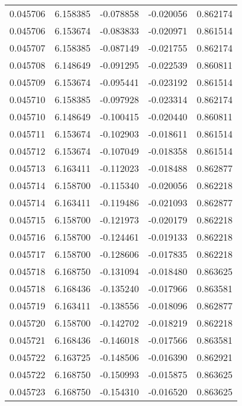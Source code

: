 \begin{tabular}{lrrrr}
0.045706    &  6.158385 & -0.078858 & -0.020056 &             0.862174 \\
0.045706    &  6.153674 & -0.083833 & -0.020971 &             0.861514 \\
0.045707    &  6.158385 & -0.087149 & -0.021755 &             0.862174 \\
0.045708    &  6.148649 & -0.091295 & -0.022539 &             0.860811 \\
0.045709    &  6.153674 & -0.095441 & -0.023192 &             0.861514 \\
0.045710    &  6.158385 & -0.097928 & -0.023314 &             0.862174 \\
0.045710    &  6.148649 & -0.100415 & -0.020440 &             0.860811 \\
0.045711    &  6.153674 & -0.102903 & -0.018611 &             0.861514 \\
0.045712    &  6.153674 & -0.107049 & -0.018358 &             0.861514 \\
0.045713    &  6.163411 & -0.112023 & -0.018488 &             0.862877 \\
0.045714    &  6.158700 & -0.115340 & -0.020056 &             0.862218 \\
0.045714    &  6.163411 & -0.119486 & -0.021093 &             0.862877 \\
0.045715    &  6.158700 & -0.121973 & -0.020179 &             0.862218 \\
0.045716    &  6.158700 & -0.124461 & -0.019133 &             0.862218 \\
0.045717    &  6.158700 & -0.128606 & -0.017835 &             0.862218 \\
0.045718    &  6.168750 & -0.131094 & -0.018480 &             0.863625 \\
0.045718    &  6.168436 & -0.135240 & -0.017966 &             0.863581 \\
0.045719    &  6.163411 & -0.138556 & -0.018096 &             0.862877 \\
0.045720    &  6.158700 & -0.142702 & -0.018219 &             0.862218 \\
0.045721    &  6.168436 & -0.146018 & -0.017566 &             0.863581 \\
0.045722    &  6.163725 & -0.148506 & -0.016390 &             0.862921 \\
0.045722    &  6.168750 & -0.150993 & -0.015875 &             0.863625 \\
0.045723    &  6.168750 & -0.154310 & -0.016520 &             0.863625 \\

\end{tabular}
